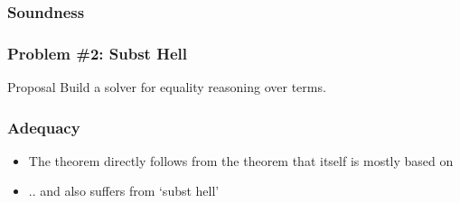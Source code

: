 \documentclass[dvipsnames,aspectratio=169,pdftex]{beamer}
\begin{document}
\begin{frame}[fragile]
  \frametitle{Soundness}
  \BigStepSoundnessType
  \SmallStepSoundness
  \vspace{-12.5mm} 
  \SmallStepSoundnessProofExcerpt
\end{frame}

\begin{frame}[fragile]
  \frametitle{Problem \#2: Subst Hell}
  \begin{exampleblock}{Proposal}
    Build a solver for equality reasoning over  terms. 
  \end{exampleblock}
\end{frame}

\begin{frame}[fragile]
  \frametitle{Adequacy}
  \FundamentalAdequacyType
  \vspace{-12.5mm} 
  \FundamentalAdequacyBody
  \begin{itemize}
    \item The  theorem directly follows from the  theorem that itself is mostly based on \cite{DBLP:journals/corr/abs-1907-11133,ahmed23:_oplss}
    \item .. and also suffers from `subst hell'
  \end{itemize}
\end{frame}
\end{document}

